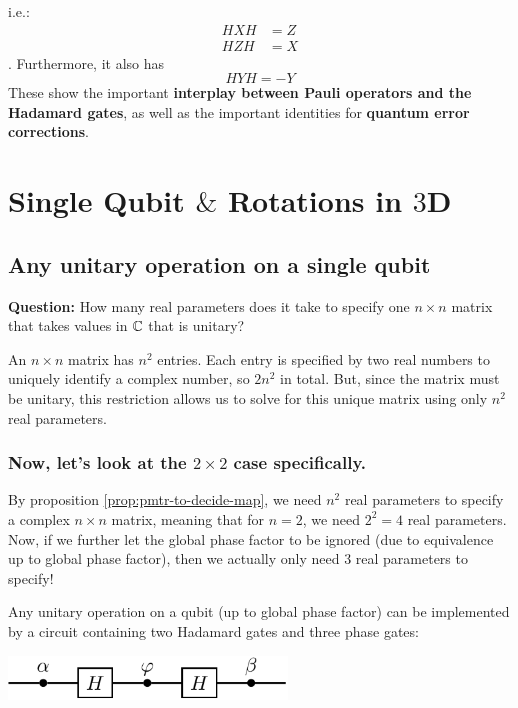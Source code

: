 \documentclass[12pt]{article}
\begin{document}
\begin{proposition}\label{prop:flip-identities}
i.e.: $$
\begin{aligned}
HXH &= Z\\
HZH &= X
\end{aligned}
$$. Furthermore, it also has $$
HYH = -Y
$$
These show the important \textbf{interplay between Pauli operators and the Hadamard gates}, as well as the important identities for \textbf{quantum error corrections}.
\end{proposition}

\section{Single Qubit $\&$ Rotations in $3$D}
\subsection{Any unitary operation on a single qubit}
\textbf{Question:} How many real parameters does it take to specify one $n\times n$ matrix that takes values in ${\mathbb C}$ that is unitary?
\begin{proposition}\label{prop:pmtr-to-decide-map}
An $n\times n$ matrix has $n^2$ entries. Each entry is specified by two real numbers to uniquely identify a complex number, so $2n^2$ in total. But, since the matrix must be unitary, this restriction allows us to solve for this unique matrix using only $n^2$ real parameters.
\end{proposition}

\subsubsection{Now, let's look at the $2\times 2$ case specifically.}
By proposition \ref{prop:pmtr-to-decide-map}, we need $n^2$ real parameters to specify a complex $n\times n$ matrix, meaning that for $n=2$, we need $2^2 = 4$ real parameters. Now, if we further let the global phase factor to be ignored (due to equivalence up to global phase factor), then we actually only need $3$ real parameters to specify!

\begin{lemma}\label{lemma:circuit-for-all-2-by-2}
Any unitary operation on a qubit (up to global phase factor) can be implemented by a circuit containing two Hadamard gates and three phase gates:
\begin{center}
\includegraphics[width = 20em]{images/6.jpg}
\end{center}
\end{lemma}
\end{document}
